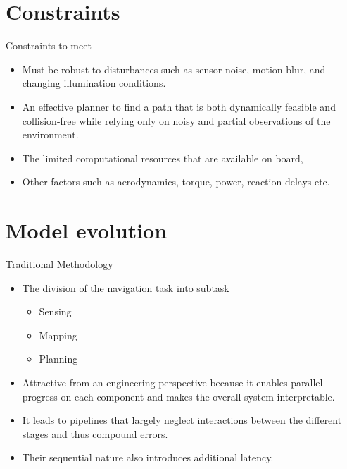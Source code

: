 \documentclass{beamer}
\begin{document}
\section{Constraints}
\begin{frame}{Constraints to meet}
	\begin{itemize}
		\item Must be robust to disturbances such as sensor noise, motion blur, and changing illumination conditions.
		\item An effective planner to find a path that is both dynamically feasible and collision-free while relying only on noisy and partial observations of the environment.
		\item The limited computational resources that are available on board, 
		\item Other factors such as aerodynamics, torque, power, reaction delays etc.
	\end{itemize}
\end{frame}


\section{Model evolution}

\begin{frame}{Traditional Methodology}
	\begin{itemize}
		\item The division of the navigation task into subtask
		\begin{itemize}
			\item Sensing
			\item Mapping
			\item Planning	
		\end{itemize} 
	
		\item Attractive from an engineering perspective because it enables parallel progress on each component and makes the overall system interpretable. 
		\item It leads to pipelines that largely neglect interactions between the different stages and thus compound errors. 
		\item Their sequential nature also introduces additional latency.
	\end{itemize}
\end{frame}
\end{document}

